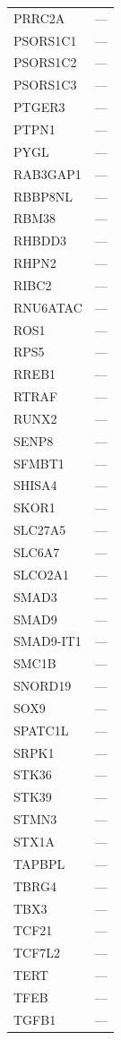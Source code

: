 \begin{longtable}{ll}
  PRRC2A & --- \\
  PSORS1C1 & --- \\
  PSORS1C2 & --- \\
  PSORS1C3 & --- \\
  PTGER3 & --- \\
  PTPN1 & --- \\
  PYGL & --- \\
  RAB3GAP1 & --- \\
  RBBP8NL & --- \\
  RBM38 & --- \\
  RHBDD3 & --- \\
  RHPN2 & --- \\
  RIBC2 & --- \\
  RNU6ATAC & --- \\
  ROS1 & --- \\
  RPS5 & --- \\
  RREB1 & --- \\
  RTRAF & --- \\
  RUNX2 & --- \\
  SENP8 & --- \\
  SFMBT1 & --- \\
  SHISA4 & --- \\
  SKOR1 & --- \\
  SLC27A5 & --- \\
  SLC6A7 & --- \\
  SLCO2A1 & --- \\
  SMAD3 & --- \\
  SMAD9 & --- \\
  SMAD9-IT1 & --- \\
  SMC1B & --- \\
  SNORD19 & --- \\
  SOX9 & --- \\
  SPATC1L & --- \\
  SRPK1 & --- \\
  STK36 & --- \\
  STK39 & --- \\
  STMN3 & --- \\
  STX1A & --- \\
  TAPBPL & --- \\
  TBRG4 & --- \\
  TBX3 & --- \\
  TCF21 & --- \\
  TCF7L2 & --- \\
  TERT & --- \\
  TFEB & --- \\
  TGFB1 & --- \\

\end{longtable}
